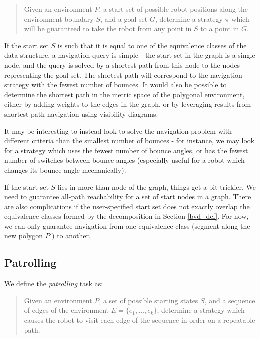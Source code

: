 \documentclass[]{styles/svproc}  %
\begin{document}
\begin{quotation}
Given an environment $P$, a start set of possible robot positions along the
environment boundary $S$, and a goal set $G$, determine a strategy $\pi$ which
will be guaranteed to take the robot from any point in $S$ to a point in $G$.
\end{quotation}

If the start set $S$ is such that it is equal to one of the equivalence
classes of the data structure, a navigation query is simple - the start set in
the graph is a single node, and the query is solved by a shortest path from this
node to the nodes representing the goal set. The shortest path will correspond
to the navigation strategy with the fewest number of bounces. It would also be
possible to determine the shortest path in the metric space of the polygonal
environment, either by adding weights to the edges in the graph, or by
leveraging results from shortest path navigation using visibility diagrams.

It may be
interesting to instead look to solve the navigation problem with different
criteria than the smallest number of bounces - for instance, we may look for a
strategy which uses the fewest number of bounce angles, or has the fewest number
of switches between bounce angles (especially useful for a robot which changes
its bounce angle mechanically).

If the start set $S$ lies in more than node of the graph, things get a bit
trickier. We need to guarantee all-path reachability for a set of start nodes in
a graph. There are also complications if the user-specified start set does not
exactly overlap the equivalence classes formed by the decomposition in Section
\ref{bvd_def}. For now, we can only guarantee navigation from one equivalence
class (segment along the new polygon $P'$) to another.



\subsection{Patrolling \label{patrol}}

We define the \emph{patrolling} task as:

\begin{quotation}
Given an environment $P$, a set of possible starting states $S$, and
a sequence of edges of the environment $E = \{e_1, \ldots, e_k\}$,
determine a strategy which causes the robot to visit each edge of the sequence
in order on a repeatable path.
\end{quotation}
\end{document}
